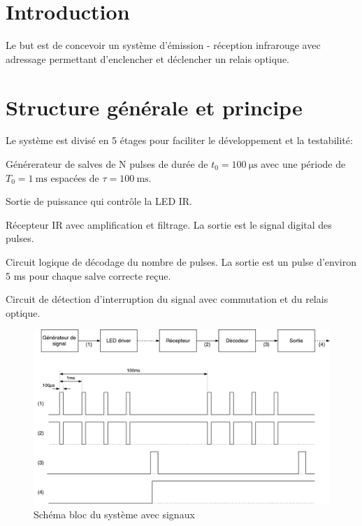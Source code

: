 \documentclass[french]{layout/Report}
\begin{document}


\section{Introduction}
Le but est de concevoir un système d'émission - réception infrarouge avec adressage
permettant d'enclencher et déclencher un relais optique.

\section{Structure générale et principe}

Le système est divisé en 5 étages pour faciliter le développement et la testabilité:

\begin{description}[leftmargin=!,labelwidth=4cm, labelindent=\parindent]
	\item[Générateur de signal] Générerateur de salves de N pulses de durée de $t_0 =  \SI{100}{\micro\second}$ avec une période de $T_0 = \SI{1}{\milli\second}$ espacées de $\tau = \SI{100}{\milli\second}$.
\item[LED driver] Sortie de puissance qui contrôle la LED IR.
\item[Récepteur] Récepteur IR avec amplification et filtrage. La sortie est le signal digital des pulses.
\item[Décodeur] Circuit logique de décodage du nombre de pulses. La sortie est un pulse d'environ 5 \si{\milli\second} pour chaque salve correcte reçue.
\item[Sortie] Circuit de détection d'interruption du signal avec commutation et du relais optique.
\end{description}

\begin{figure}[h]
\centering
\vspace{5mm}
\includegraphics[width=\textwidth]{fig/IRemote_schema_structure}
\caption{Schéma bloc du système avec signaux}
\label{fig:schema_bloc}
\vspace{5mm}
\end{figure}
\end{document}
